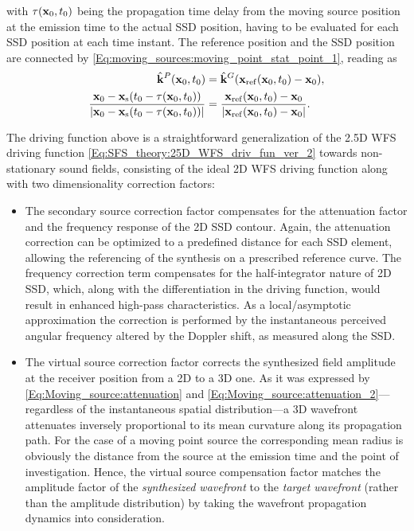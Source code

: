 with $\tau(\mathbf{x}_0,t_0)$ being the propagation time delay from the moving source position at the emission time to the actual SSD position, having to be evaluated for each SSD position at each time instant.
The reference position and the SSD position are connected by \eqref{Eq:moving_sources:moving_point_stat_point_1}, reading as
\begin{align}
\label{Eq:SFS_theory:25D_WFS_ref_point}
\hat{\mathbf{k}}^P(\mathbf{x}_0,t_0) &= \hat{\mathbf{k}}^G(\mathbf{x}_{\mathrm{ref}}(\mathbf{x}_0,t_0)-\mathbf{x}_0),
\\
\frac{\mathbf{x}_0 -\mathbf{x}_{\mathrm{s}}(t_0-\tau(\mathbf{x}_0,t_0))}{|\mathbf{x}_0-\mathbf{x}_{\mathrm{s}}(t_0 - \tau(\mathbf{x}_0,t_0))|} &=  \frac{\mathbf{x}_{\mathrm{ref}}(\mathbf{x}_0,t_0)-\mathbf{x}_0}{|\mathbf{x}_{\mathrm{ref}}(\mathbf{x}_0,t_0)-\mathbf{x}_0|}.
\end{align}

The driving function above is a straightforward generalization of the 2.5D WFS driving function \eqref{Eq:SFS_theory:25D_WFS_driv_fun_ver_2} towards non-stationary sound fields, consisting of the ideal 2D WFS driving function along with two dimensionality correction factors:
\begin{itemize}
\item The secondary source correction factor compensates for the attenuation factor and the frequency response of the 2D SSD contour.
Again, the attenuation correction can be optimized to a predefined distance for each SSD element, allowing the referencing of the synthesis on a prescribed reference curve.
The frequency correction term compensates for the half-integrator nature of 2D SSD, which, along with the differentiation in the driving function, would result in enhanced high-pass characteristics.
As a local/asymptotic approximation the correction is performed by the instantaneous perceived angular frequency altered by the Doppler shift, as measured along the SSD.
\item The virtual source correction factor corrects the synthesized field amplitude at the receiver position from a 2D to a 3D one.
As it was expressed by \eqref{Eq:Moving_source:attenuation} and \eqref{Eq:Moving_source:attenuation_2}---regardless of the instantaneous spatial distribution---a 3D wavefront attenuates inversely proportional to its mean curvature along its propagation path.
For the case of a moving point source the corresponding mean radius is obviously the distance from the source at the emission time and the point of investigation.
Hence, the virtual source compensation factor matches the amplitude factor of the \emph{synthesized wavefront} to the \emph{target wavefront} (rather than the amplitude distribution) by taking the wavefront propagation dynamics into consideration.
\end{itemize}

